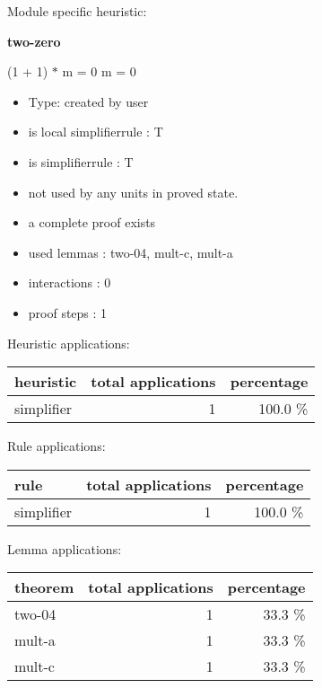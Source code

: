 \documentclass[a4paper]{article}
\begin{document}
Module specific heuristic:

\pagebreak

{\LARGE\bf two-zero}\label{lemma-two-zero}

\medskip

 \Fol (1 + 1) $*$ m = 0 \Equiv m = 0

\begin{itemize}

\item Type: created by user

\item is local simplifierrule : T
\item is simplifierrule : T
\item not used by any units in proved state.
\item       a complete proof exists
\item       used lemmas  : two-04, mult-c, mult-a
\item       interactions : 0
\item       proof steps  : 1
\end{itemize}

\medskip


Heuristic applications:

\begin{supertabular}{l|r|r}
heuristic	& total applications & percentage \\ \hline
simplifier & 1 & 100.0 \% \\

\end{supertabular}

Rule applications:

\begin{supertabular}{l|r|r}
rule	        & total applications & percentage \\ \hline
simplifier & 1 & 100.0 \% \\

\end{supertabular}

Lemma applications:

\begin{supertabular}{l|r|r}
theorem	        & total applications & percentage \\ \hline
two-04 & 1 & 33.3 \% \\
mult-a & 1 & 33.3 \% \\
mult-c & 1 & 33.3 \% \\

\end{supertabular}
\end{document}
